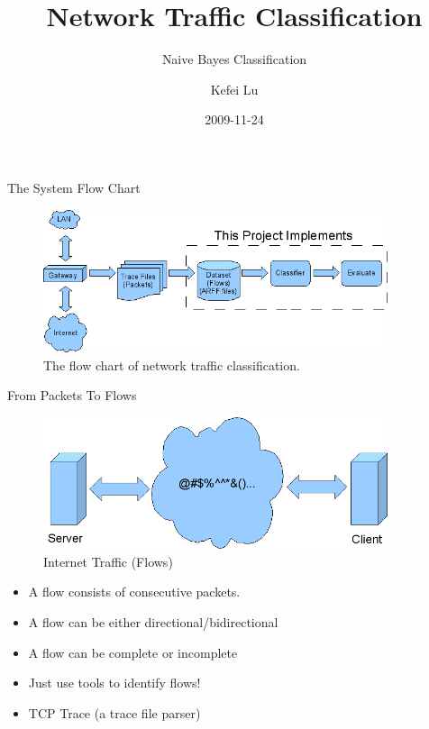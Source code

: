 \documentclass{beamer}
\title[Network Traffic Classification] %
{Network Traffic Classification}
\subtitle
{Naive Bayes Classification}
\author %
{Kefei Lu}
\institute[Universities of Miami] %
{
  Department of Electrical and Computer Engineering\\
  University of Miami}
\date[] %
{2009-11-24}
\begin{document}
\begin{frame}
  \titlepage
\end{frame}


\begin{frame}{The System Flow Chart}
	\begin{figure}[tbp]
	    \centering
	    \includegraphics[width=0.9\textwidth]{pic/flow_chart.png}
	    \caption{The flow chart of network traffic classification.}
	    \label{fig:flow_chart}
	\end{figure}
\end{frame}

\begin{frame}{From Packets To Flows}
	\begin{figure}[tbp]
	    \centering
	    \includegraphics[width=0.9\textwidth]{pic/network_flow.png}
	    \caption{Internet Traffic (Flows)}
	    \label{fig:flow_chart}
	\end{figure}
	\begin{itemize}
	    \item
		A flow consists of consecutive packets.
	    \item
		A flow can be either directional/bidirectional
	    \item
		A flow can be complete or incomplete
	    \item
		Just use tools to identify flows!
	    \item
		TCP Trace (a trace file parser)
	\end{itemize}
\end{frame}
\end{document}

